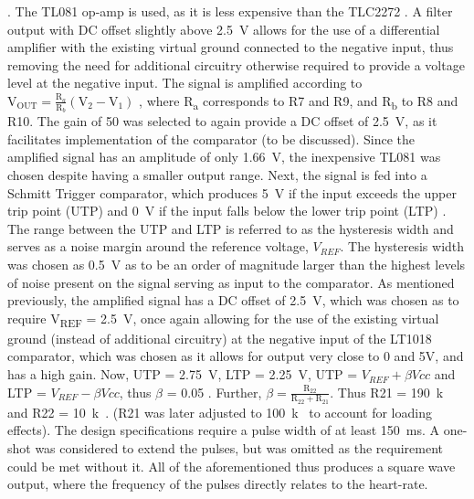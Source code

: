 \cite{filter}. The TL081 op-amp is used, as it is less expensive than the TLC2272 \cite{octo}. A filter output with DC offset slightly above \SI{2.5}{V} allows for the use of a differential amplifier with the existing virtual ground connected to the negative input, thus removing the need for additional circuitry otherwise required to provide a voltage level at the negative input. The signal is amplified according to $\mathrm{V}_{\mathrm{OUT}}=\frac{\mathrm{R}_{a}}{\mathrm{R}_{b}}\left(\mathrm{V}_{2}-\mathrm{V}_{1}\right)$ \cite{opamp}, where R\textsubscript{a} corresponds to R7 and R9, and R\textsubscript{b} to R8 and R10. The gain of 50 was selected to again provide a DC offset of \SI{2.5}{V}, as it facilitates implementation of the comparator (to be discussed). Since the amplified signal has an amplitude of only \SI{1.66}{V}, the inexpensive TL081 was chosen despite having a smaller output range. Next, the signal is fed into a Schmitt Trigger comparator, which produces \SI{5}{V} if the input exceeds the upper trip point (UTP) and \SI{0}{V} if the input falls below the lower trip point (LTP) \cite{schmitt}. The range between the UTP and LTP is referred to as the hysteresis width and serves as a noise margin \cite{schmitt} around the reference voltage, $V_{REF}$. The hysteresis width was chosen as \SI{0.5}{V} as to be an order of magnitude larger than the highest levels of noise present on the signal serving as input to the comparator. As mentioned previously, the amplified signal has a DC offset of \SI{2.5}{V}, which was chosen as to require V\textsubscript{REF} = \SI{2.5}{V}, once again allowing for the use of the existing virtual ground (instead of additional circuitry) at the negative input of the LT1018 comparator, which was chosen as it allows for output very close to 0 and 5V, and has a high gain. Now, UTP = \SI{2.75}{V}, LTP = \SI{2.25}{V}, UTP = $V_{REF} + \beta Vcc$ and LTP = $V_{REF} - \beta Vcc$, thus $\beta$ = 0.05 \cite{schmitt}. Further, $\beta=\frac{\mathrm{R}_{22}}{\mathrm{R}_{22}+\mathrm{R}_{21}}$. Thus R21 = \SI{190}{k\Omega} and R22 = \SI{10}{k\Omega}. (R21 was later adjusted to \SI{100}{k\Omega} to account for loading effects). The design specifications require a pulse width of at least \SI{150}{ms}. A one-shot was considered to extend the pulses, but was omitted as the requirement could be met without it. All of the aforementioned thus produces a square wave output, where the frequency of the pulses directly relates to the heart-rate.\\

